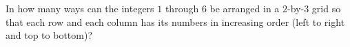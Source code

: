 In how many ways can the integers $1$ through $6$ be arranged in a $2$-by-$3$ grid so that each row and each column has its numbers in increasing order (left to right and top to bottom)?

